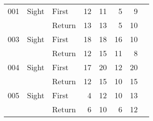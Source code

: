 \begin{table}[!htb]
\begin{tabular}{lllrrrrr}
001 & Sight & First &    12 &                                                    11 &                                                      5 &       9 \\
    &       & Return &    13 &                                                    13 &                                                      5 &      10 \\
003 & Sight & First &    18 &                                                    18 &                                                     16 &      10 \\
    &       & Return &    12 &                                                    15 &                                                     11 &       8 \\
004 & Sight & First &    17 &                                                    20 &                                                     12 &      20 \\
    &       & Return &    12 &                                                    15 &                                                     10 &      15 \\
005 & Sight & First &     4 &                                                    12 &                                                     10 &      13 \\
    &       & Return &     6 &                                                    10 &                                                      6 &      12 \\
\bottomrule
\end{tabular}
\end{table}

